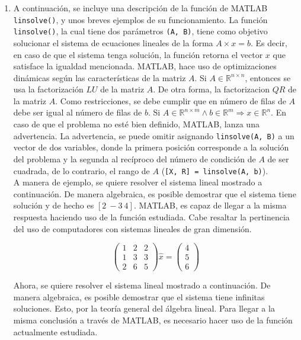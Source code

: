 \documentclass[11pt, spanish]{article}
\begin{document}
\begin{enumerate}


\item A continuación, se incluye una descripción de la función de \textsc{MATLAB} \texttt{linsolve()}, y unos breves ejemplos de su funcionamiento. La función \texttt{linsolve()}, la cual tiene dos parámetros \texttt{(A, B)}, tiene como objetivo solucionar el sistema de ecuaciones lineales de la forma $A \times x = b$. Es decir, en caso de que el sistema tenga solución, la función retorna el vector $x$ que satisface la igualdad mencionada. \textsc{MATLAB}, hace uso de optimizaciones dinámicas según las características de la matriz $A$. Si $A \in \mathbb{R}^{n\times n}$, entonces se usa la factorización $LU$ de la matriz $A$. De otra forma, la factorizacion $QR$ de la matriz $A$. Como restricciones, se debe cumplir que en número de filas de $A$ debe ser igual al número de filas de $b$. Si $A \in \mathbb{R}^{n \times m} \wedge b \in \mathbb{R}^m \Rightarrow x \in \mathbb{R}^n$. En caso de que el problema no esté bien definido, \textsc{MATLAB}, lanza una advertencia. La advertencia, se puede omitir asignando \texttt{linsolve(A, B)} a un vector de dos variables, donde la primera posición corresponde a la solución del problema y la segunda al recíproco del número de condición de $A$ de ser cuadrada, de lo contrario, el rango de $A$ (\texttt{[X, R] = linsolve(A, b)}).\\

A manera de ejemplo, se quiere resolver el sistema lineal mostrado a continuación. De manera algebraica, es posible demostrar que el sistema tiene solución y de hecho es $[2\ -3\ 4]$. \textsc{MATLAB}, es capaz de llegar a la misma respuesta haciendo uso de la función estudiada. Cabe resaltar la pertinencia del uso de computadores con sistemas lineales de gran dimensión.

$$\left(\begin{array}{ccc} 1 & 2 & 2\\ 1 & 3 & 3\\ 2 & 6 & 5 \end{array}\right) \hat{x} = \left(\begin{array}{c} 4\\ 5\\ 6 \end{array}\right)$$

Ahora, se quiere resolver el sistema lineal mostrado a continuación. De manera algebraica, es posible demostrar que el sistema tiene infinitas soluciones. Esto, por la teoría general del álgebra lineal. Para llegar a la misma conclusión a través de \textsc{MATLAB}, es necesario hacer uso de la función actualmente estudiada.


\end{enumerate}
\end{document}
